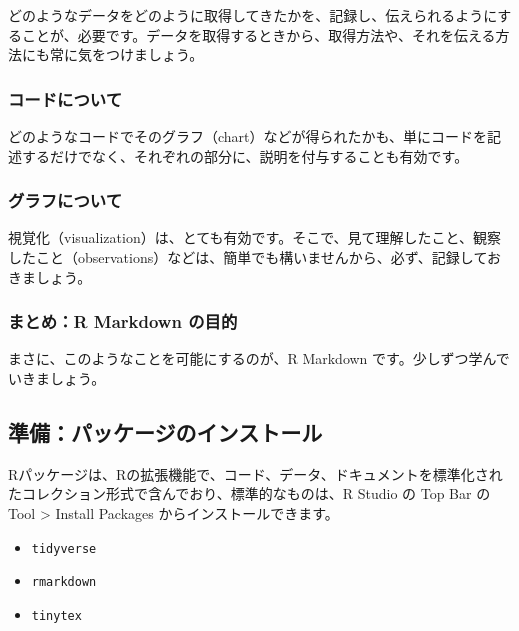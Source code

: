 \documentclass[
]{bxjsbook}
\providecommand{\tightlist}{%
  \setlength{\itemsep}{0pt}\setlength{\parskip}{0pt}}
\theoremstyle{definition}
\theoremstyle{definition}
\theoremstyle{definition}
\theoremstyle{definition}
\theoremstyle{remark}
\begin{document}
どのようなデータをどのように取得してきたかを、記録し、伝えられるようにすることが、必要です。データを取得するときから、取得方法や、それを伝える方法にも常に気をつけましょう。

\hypertarget{ux30b3ux30fcux30c9ux306bux3064ux3044ux3066}{%
\subsubsection{コードについて}\label{ux30b3ux30fcux30c9ux306bux3064ux3044ux3066}}

どのようなコードでそのグラフ（chart）などが得られたかも、単にコードを記述するだけでなく、それぞれの部分に、説明を付与することも有効です。

\hypertarget{ux30b0ux30e9ux30d5ux306bux3064ux3044ux3066}{%
\subsubsection{グラフについて}\label{ux30b0ux30e9ux30d5ux306bux3064ux3044ux3066}}

視覚化（visualization）は、とても有効です。そこで、見て理解したこと、観察したこと（observations）などは、簡単でも構いませんから、必ず、記録しておきましょう。

\hypertarget{ux307eux3068ux3081r-markdown-ux306eux76eeux7684}{%
\subsubsection{まとめ：R Markdown の目的}\label{ux307eux3068ux3081r-markdown-ux306eux76eeux7684}}

まさに、このようなことを可能にするのが、R Markdown です。少しずつ学んでいきましょう。

\hypertarget{ux6e96ux5099ux30d1ux30c3ux30b1ux30fcux30b8ux306eux30a4ux30f3ux30b9ux30c8ux30fcux30eb}{%
\subsection{準備：パッケージのインストール}\label{ux6e96ux5099ux30d1ux30c3ux30b1ux30fcux30b8ux306eux30a4ux30f3ux30b9ux30c8ux30fcux30eb}}

Rパッケージは、Rの拡張機能で、コード、データ、ドキュメントを標準化されたコレクション形式で含んでおり、標準的なものは、R Studio の Top Bar の Tool \textgreater{} Install Packages からインストールできます。

\begin{itemize}
\tightlist
\item
  \texttt{tidyverse}
\item
  \texttt{rmarkdown}
\item
  \texttt{tinytex}
\end{itemize}
\end{document}
